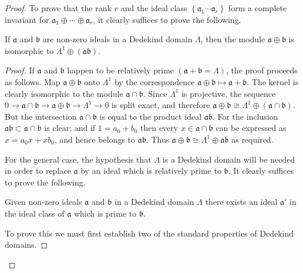 \begin{proof}
To prove that the rank $r$ and the ideal class $\left\{\mathfrak{a}_{1} \cdots \mathfrak{a}_{r}\right\}$ form a complete invariant for $\mathfrak{a}_{1} \oplus \cdots \oplus \mathfrak{a}_{r}$, it clearly suffices to prove the following.

\begin{lem}\label{1.7}
	If $\mathfrak{a}$ and $\mathfrak{b}$ are non-zero ideals in a Dedekind domain $\Lambda$, then the module $\mathfrak{a} \oplus \mathfrak{b}$ is isomorphic to $\Lambda^{1} \oplus(\mathfrak{a} \mathfrak{b})$.
\end{lem}

\begin{proof}
	If $\mathfrak{a}$ and $\mathfrak{b}$ happen to be relatively prime $(\mathfrak{a}+\mathfrak{b}=\Lambda)$, the proof proceeds as follows. Map $\mathfrak{a} \oplus \mathfrak{b}$ onto $\Lambda^{1}$ by the correspondence $\mathfrak{a} \oplus \mathfrak{b} \mapsto \mathfrak{a}+\mathfrak{b}$. The kernel is clearly isomorphic to the module $\mathfrak{a} \cap \mathfrak{b}$. Since $\Lambda^{1}$ is projective, the sequence $0 \to \mathfrak{a} \cap \mathfrak{b} \to \mathfrak{a} \oplus \mathfrak{b} \to \Lambda^{1} \to 0$ is split exact, and therefore $\mathfrak{a} \oplus \mathfrak{b} \cong \Lambda^{1} \oplus (\mathfrak{a} \cap \mathfrak{b})$. But the intersection $\mathfrak{a} \cap \mathfrak{b}$ is equal to the product ideal $\mathfrak{a} \mathfrak{b}$. For the inclusion $\mathfrak{a} \mathfrak{b} \subset \mathfrak{a} \cap \mathfrak{b}$ is clear; and if $1=a_{0}+b_{0}$ then every $x \in \mathfrak{a} \cap \mathfrak{b}$ can be expressed as $x=a_{0} x+x b_{0}$, and hence belongs to $\mathfrak{a} \mathfrak{b}$. Thus $\mathfrak{a} \oplus \mathfrak{b} \cong \Lambda^{1} \oplus \mathfrak{a} \mathfrak{b}$ as required.

	For the general case, the hypothesis that $\Lambda$ is a Dedekind domain will be needed in order to replace $\mathfrak{a}$ by an ideal which is relatively prime to $\mathfrak{b}$. It clearly suffices to prove the following.

\begin{lem}\label{lem:1.8}
	Given non-zero ideals $\mathfrak{a}$ and $\mathfrak{b}$ in a Dedekind domain $\Lambda$ there exists an ideal $\mathfrak{a}'$ in the ideal class of $\mathfrak{a}$ which is prime to $\mathfrak{b} $.
\end{lem}

To prove this we must first establish two of the standard properties of Dedekind domains.


\end{proof}
\end{proof}
